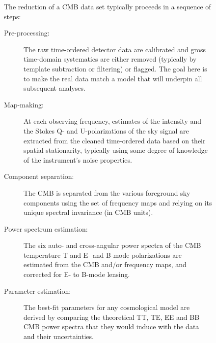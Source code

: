 \begin{figure}[htbp]
\begin{minipage}[h]{0.7\linewidth}
The reduction of a CMB data set typically proceeds in a sequence of steps:
\begin{description}
\item[ Pre-processing:] The raw time-ordered detector data are calibrated and gross time-domain systematics are either removed (typically by template subtraction or filtering) or flagged. The goal here is to make the real data match a model that will underpin all subsequent analyses.
\item[Map-making:] At each observing frequency, estimates of the intensity and the Stokes Q- and U-polarizations of the sky signal are extracted from the cleaned time-ordered data based on their spatial stationarity, typically using some degree of knowledge of the instrument's noise properties.
\item[Component separation:] The CMB is separated from the various foreground sky components using the set of frequency maps and relying on its unique spectral invariance (in CMB units).
\item[Power spectrum estimation:] The six auto- and cross-angular power spectra of the CMB temperature T and E- and B-mode polarizations are estimated from the CMB and/or frequency maps, and corrected for E- to B-mode lensing.
\item[Parameter estimation:] The best-fit parameters for any cosmological model are derived by comparing the theoretical TT, TE, EE and BB CMB power spectra that they would induce with the data and their uncertainties.
\end{description}
\end{minipage}
\begin{minipage}[h]{0.3\linewidth}
\centering

\end{minipage}
\end{figure}
